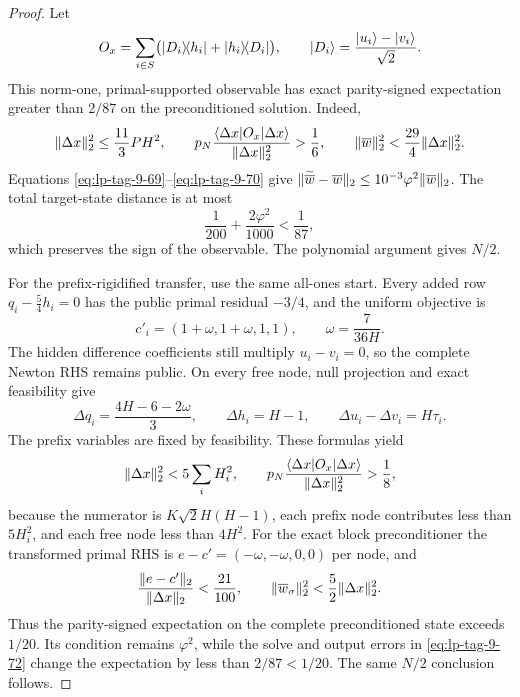 \begin{proof}
Let
\[
 O_x=\sum_{i\in S}
 \bigl(\lvert D_i\rangle\!\langle h_i\rvert+\lvert h_i\rangle\!\langle D_i\rvert\bigr),
 \qquad
 \lvert D_i\rangle=\frac{\lvert u_i\rangle-\lvert v_i\rangle}{\sqrt2}.
\]
This norm-one, primal-supported observable has exact parity-signed
expectation greater than \(2/87\) on the preconditioned solution.  Indeed,
\begin{equation}
 \lVert\Delta x\rVert_2^2\leq\frac{11}{3}PH^2,\qquad
 p_N\frac{\langle\Delta x|O_x|\Delta x\rangle}
              {\lVert\Delta x\rVert_2^2}>\frac16,\qquad
 \lVert\overline w\rVert_2^2<\frac{29}{4}\lVert\Delta x\rVert_2^2.
\end{equation}
Equations \eqref{eq:lp-tag-9-69}--\eqref{eq:lp-tag-9-70} give
\(\lVert\widetilde{\overline w}-\overline w\rVert_2
 \leq10^{-3}\varphi^2\lVert\overline w\rVert_2\).  The total target-state
distance is at most
\begin{equation}
 \frac1{200}+\frac{2\varphi^2}{1000}<\frac1{87},
\label{eq:lp-tag-9-72}
\end{equation}
which preserves the sign of the observable.  The polynomial argument gives
\(N/2\).

For the prefix-rigidified transfer, use the same all-ones start.  Every
added row \(q_i-\frac54h_i=0\) has the public primal residual \(-3/4\), and
the uniform objective is
\[
 c'_i=(1+\omega,1+\omega,1,1),\qquad
 \omega=\frac7{36H}.
\]
The hidden difference coefficients still multiply \(u_i-v_i=0\), so the
complete Newton RHS remains public.  On every free node, null projection and
exact feasibility give
\[
 \Delta q_i=\frac{4H-6-2\omega}{3},\qquad
 \Delta h_i=H-1,\qquad
 \Delta u_i-\Delta v_i=H\tau_i.
\]
The prefix variables are fixed by feasibility.  These formulas yield
\[
 \lVert\Delta x\rVert_2^2<5\sum_iH_i^2,\qquad
 p_N\frac{\langle\Delta x|O_x|\Delta x\rangle}
              {\lVert\Delta x\rVert_2^2}>\frac18,
\]
because the numerator is \(K\sqrt2H(H-1)\), each prefix node contributes
less than \(5H_i^2\), and each free node less than \(4H^2\).
For the exact block preconditioner the transformed primal RHS is
\(e-c'=(-\omega,-\omega,0,0)\) per node, and
\[
 \frac{\lVert e-c'\rVert_2}{\lVert\Delta x\rVert_2}<\frac{21}{100},
 \qquad
 \lVert\overline w_\sigma\rVert_2^2
 <\frac52\lVert\Delta x\rVert_2^2.
\]
Thus the parity-signed expectation on the complete preconditioned state
exceeds \(1/20\).  Its condition remains \(\varphi^2\), while the solve and
output errors in \eqref{eq:lp-tag-9-72} change the expectation by less than
\(2/87<1/20\).  The same \(N/2\) conclusion follows.
\end{proof}

